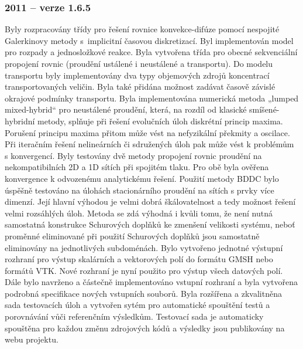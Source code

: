 \documentclass[11pt]{report}
\begin{document}
\subsubsection{2011 -- verze 1.6.5}
Byly rozpracovány třídy pro řešení rovnice konvekce-difúze pomocí nespojité 
Galerkinovy metody s~implicitní časovou diskretizací. Byl implementován model 
pro rozpady a jednosložkové reakce. Byla vytvořena třída pro obecné sekvenciální 
propojení rovnic (proudění ustálené i neustálené a transportu). Do modelu 
transportu byly implementovány dva typy objemových zdrojů koncentrací 
transportovaných veličin. Byla také přidána možnost zadávat časově závislé 
okrajové podmínky transportu.
Byla implementována numerická metoda „lumped mixed-hybrid“ pro neustálené 
proudění, která, na rozdíl od klasické smíšené-hybridní metody, splňuje při 
řešení evolučních úloh diskrétní princip maxima. Porušení principu maxima přitom 
může vést na nefyzikální překmity a oscilace. Při iteračním řešení nelineárních 
či sdružených úloh pak může vést k problémům s konvergencí.
Byly testovány dvě metody propojení rovnic proudění na nekompatibilních 2D a 1D 
sítích při spojitém tlaku. Pro obě byla ověřena konvergence k odvozenému 
analytickému řešení.
Použití metody BDDC bylo úspěšně testováno na úlohách stacionárního proudění na 
sítích s prvky více dimenzí. Její hlavní výhodou je velmi dobrá škálovatelnost a 
tedy možnost řešení velmi rozsáhlých úloh. Metoda se zdá výhodná i kvůli tomu, 
že není nutná samostatná konstrukce Schurových doplňků ke zmenšení velikosti 
systému, neboť proměnné eliminované při použití Schurových doplňků jsou 
samostatně eliminovány na jednotlivých subdoménách.
Bylo vytvořeno jednotné výstupní rozhraní pro výstup skalárních a vektorových 
polí do formátu GMSH nebo formátů VTK. Nové rozhraní je nyní použito pro výstup 
všech datových polí. Dále bylo navrženo a částečně implementováno vstupní 
rozhraní a byla vytvořena podrobná specifikace nových vstupních souborů. 
Byla rozšířena a zkvalitněna sada testovacích úloh a vytvořen sytém pro 
automatické spouštění testů a porovnávání vůči referenčním výsledkům. Testovací 
sada je automaticky spouštěna pro každou změnu zdrojových kódů a výsledky jsou 
publikovány na webu projektu. 
\end{document}
